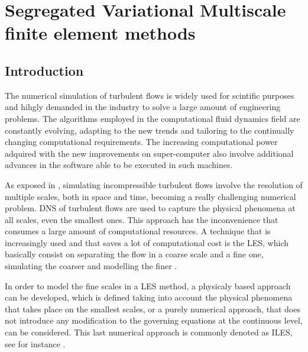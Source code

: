 \chapter{Segregated Variational Multiscale finite element methods}
\label{chap-SVMS}

\section{Introduction}
\label{sec-C7_intro}

The numerical simulation of turbulent flows is widely used for scintific purposes and hihgly demanded in the industry to solve a large amount of engineering problems. The algorithms employed in the computational fluid dynamics field are constantly evolving, adapting to the new trends and tailoring to the continually changing computational requirements. The increasing computational power adquired with the new improvements on super-computer also involve additional advances in the software able to be executed in such machines.

As exposed in , simulating incompressible turbulent flows involve the resolution of multiple scales, both in space and time, becoming a really challenging numerical problem. DNS of turbulent flows are used to capture the physical phenomena at all scales, even the smallest ones. This approach has the inconvenience that consumes a large amount of computational resources. A technique that is increasingly used and that saves a lot of computational cost is the LES, which basically consist on separating the flow in a coarse scale and a fine one, simulating the coarser and modelling the finer \cite{sagaut_large_2000}. 

In order to model the fine scales in a LES method, a physicaly based approach can be developed, which is defined taking into account the physical phenomena that takes place on the smallest scales, or a purely numerical approach, that does not introduce any modification to the governing equations at the continuous level, can be considered. This last numerical approach is commonly denoted as ILES, see for instance \cite{boris_new_1992}.

